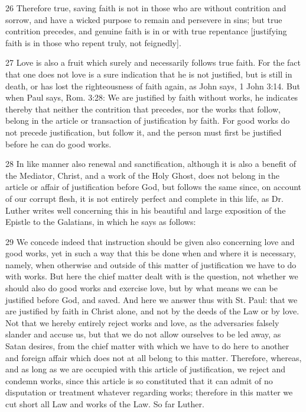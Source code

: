 26 Therefore true, saving faith is not in those who are without contrition and sorrow, and have a wicked purpose to remain and persevere in sins; but true contrition precedes, and genuine faith is in or with true repentance [justifying faith is in those who repent truly, not feignedly].

27 Love is also a fruit which surely and necessarily follows true faith. For the fact that one does not love is a sure indication that he is not justified, but is still in death, or has lost the righteousness of faith again, as John says, 1 John 3:14. But when Paul says, Rom. 3:28: We are justified by faith without works, he indicates thereby that neither the contrition that precedes, nor the works that follow, belong in the article or transaction of justification by faith. For good works do not precede justification, but follow it, and the person must first be justified before he can do good works.

28 In like manner also renewal and sanctification, although it is also a benefit of the Mediator, Christ, and a work of the Holy Ghost, does not belong in the article or affair of justification before God, but follows the same since, on account of our corrupt flesh, it is not entirely perfect and complete in this life, as Dr. Luther writes well concerning this in his beautiful and large exposition of the Epistle to the Galatians, in which he says as follows:

29 We concede indeed that instruction should be given also concerning love and good works, yet in such a way that this be done when and where it is necessary, namely, when otherwise and outside of this matter of justification we have to do with works. But here the chief matter dealt with is the question, not whether we should also do good works and exercise love, but by what means we can be justified before God, and saved. And here we answer thus with St. Paul: that we are justified by faith in Christ alone, and not by the deeds of the Law or by love. Not that we hereby entirely reject works and love, as the adversaries falsely slander and accuse us, but that we do not allow ourselves to be led away, as Satan desires, from the chief matter with which we have to do here to another and foreign affair which does not at all belong to this matter. Therefore, whereas, and as long as we are occupied with this article of justification, we reject and condemn works, since this article is so constituted that it can admit of no disputation or treatment whatever regarding works; therefore in this matter we cut short all Law and works of the Law. So far Luther.

